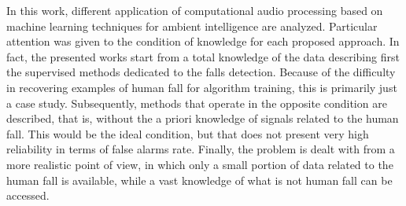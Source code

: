 In this work, different application of computational audio processing based on machine learning techniques for ambient intelligence are analyzed. Particular attention was given to the condition of knowledge for each proposed approach. In fact, the presented works start from a total knowledge of the data describing first the supervised methods dedicated to the falls detection. Because of the difficulty in recovering examples of human fall for algorithm training, this is primarily just a case study. Subsequently, methods that operate in the opposite condition are described, that is, without the a priori knowledge of signals related to the human fall. This would be the ideal condition, but that does not present very high reliability in terms of false alarms rate. Finally, the problem is dealt with from a more realistic point of view, in which only a small portion of data related to the human fall is available, while a vast knowledge of what is not human fall can be accessed.


